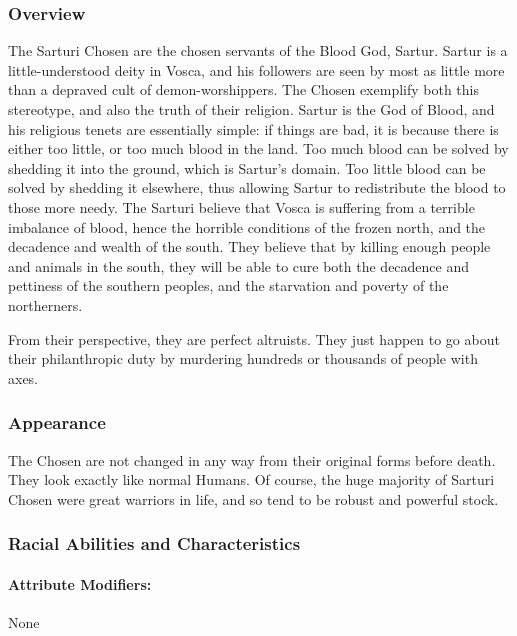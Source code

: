 \documentclass[oneside,11pt,english]{book}
\begin{document}
\subsubsection*{Overview} 
The Sarturi Chosen are the chosen servants of the Blood God, Sartur. Sartur is a little-understood deity in 
Vosca, and his followers are seen by most as little more than a depraved cult of demon-worshippers. The 
Chosen exemplify both this stereotype, and also the truth of their religion. Sartur is the God of Blood, and 
his religious tenets are essentially simple: if things are bad, it is because there is either too little, or too 
much blood in the land. Too much blood can be solved by shedding it into the ground, which is Sartur's 
domain. Too little blood can be solved by shedding it elsewhere, thus allowing Sartur to redistribute the 
blood to those more needy. The Sarturi believe that Vosca is suffering from a terrible imbalance of blood, 
hence the horrible conditions of the frozen north, and the decadence and wealth of the south. They believe 
that by killing enough people and animals in the south, they will be able to cure both the decadence and 
pettiness of the southern peoples, and the starvation and poverty of the northerners. 


From their perspective, they are perfect altruists. They just happen to go about their philanthropic duty by 
murdering hundreds or thousands of people with axes. 
\subsubsection*{Appearance} 
The Chosen are not changed in any way from their original forms before death. They look exactly like 
normal Humans. Of course, the huge majority of Sarturi Chosen were great warriors in life, and so tend to 
be robust and powerful stock. 
\subsubsection*{Racial Abilities and Characteristics} 
\paragraph{Attribute Modifiers:} None 
\end{document}
